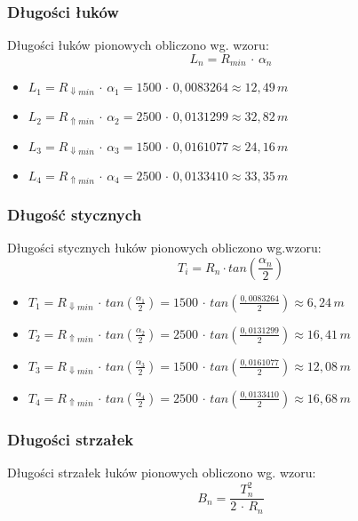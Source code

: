 \documentclass[12pt]{article}
\begin{document}
        \subsubsection{Długości łuków}
        Długości łuków pionowych obliczono wg. wzoru:
        \begin{equation}
            L_{n} = R_{min} \,\cdot\, \alpha_{n} 
        \end{equation}

        \begin{itemize}
            \item \( L_{1} = R_{\Downarrow min} \,\cdot\, \alpha_{1} = 1500 \,\cdot\, 0,0083264 \approx 12,49\,m \)
            \item \( L_{2} = R_{\Uparrow min} \,\cdot\, \alpha_{2} = 2500 \,\cdot\, 0,0131299 \approx 32,82\,m \)
            \item \( L_{3} = R_{\Downarrow min} \,\cdot\, \alpha_{3} = 1500 \,\cdot\, 0,0161077 \approx 24,16\,m \)
            \item \( L_{4} = R_{\Uparrow min} \,\cdot\, \alpha_{4} = 2500 \,\cdot\, 0,0133410 \approx 33,35\,m \)
        \end{itemize}
    \subsubsection{Długość stycznych}
        Długości stycznych łuków pionowych obliczono wg.wzoru:
        \begin{equation}
            T_{i} = R_{n} \cdot tan(\frac{\alpha_{n}}{2})
        \end{equation}

        \begin{itemize}
            \item \( T_{1} = R_{\Downarrow min} \,\cdot\, tan(\frac{\alpha_{1}}{2}) = 1500 \,\cdot\, tan(\frac{0,0083264}{2}) \approx 6,24\,m \)
            \item \( T_{2} = R_{\Uparrow min} \,\cdot\, tan(\frac{\alpha_{2}}{2}) = 2500 \,\cdot\, tan(\frac{0,0131299}{2}) \approx 16,41\,m \)
            \item \( T_{3} = R_{\Downarrow min} \,\cdot\, tan(\frac{\alpha_{3}}{2}) = 1500 \,\cdot\, tan(\frac{0,0161077}{2}) \approx 12,08\,m \)
            \item \( T_{4} = R_{\Uparrow min} \,\cdot\, tan(\frac{\alpha_{4}}{2}) = 2500 \,\cdot\, tan(\frac{0,0133410}{2}) \approx 16,68\,m \)
        \end{itemize}
        \newpage
    \subsubsection{Długości strzałek}
        Długości strzałek łuków pionowych obliczono wg. wzoru:
        \begin{equation}
            B_{n} = \frac{T_{n}^{2}}{2\,\cdot\,R_{n}}
        \end{equation}
\end{document}
